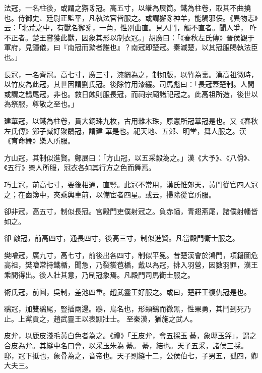 \begin{pinyinscope}
 法冠，一名柱後，或謂之獬豸冠。高五寸，以縰為展筒。鐵為柱卷，取其不曲撓也。侍御史、廷尉正監平，凡執法官皆服之。或謂獬豸神羊，能觸邪佞。《異物志》云：「北荒之中，有獸名獬豸，一角，性別曲直。見人鬥，觸不直者。聞人爭，
 咋不正者。楚王嘗獲此獸，因象其形以制衣冠。」胡廣曰：「《春秋左氏傳》晉侯觀于軍府，見鐘儀，曰『南冠而縶者誰也』？南冠即楚冠。秦滅楚，以其冠服賜執法臣也。」



 長冠，一名齊冠。高七寸，廣三寸，漆纚為之，制如版，以竹為裏。漢高祖微時，以竹皮為此冠，其世因謂劉氏冠。後除竹用漆纚。司馬彪曰：「長冠蓋楚制。人間或謂之鵲尾冠，非也。救日蝕則服長冠，而祠宗廟諸祀冠之。此高祖所造，後世以為祭服，尊敬之至也。」



 建華冠，以鐵為柱卷，貫大銅珠九枚，古用雜木珠，原憲所冠華冠是也。又《春秋左氏傳》鄭子臧好聚鷸冠，謂建
 華是也。祀天地、五郊、明堂，舞人服之。漢《育命舞》樂人所服。



 方山冠，其制似進賢。鄭展曰：「方山冠，以五采縠為之。」漢《大予》、《八佾》、《五行》樂人所服，冠衣各如其行方之色而舞焉。



 巧士冠，前高七寸，要後相通，直豎。此冠不常用，漢氏惟郊天，黃門從官四人冠之；在鹵簿中，夾乘輿車前，以備宦者四星。或云，掃除從官所服。



 卻非冠，高五寸，制似長冠。宮殿門吏僕射冠之。負赤幡，青翅燕尾，諸僕射幡皆如之。



 卻
 敵冠，前高四寸，通長四寸，後高三寸，制似進賢。凡當殿門衛士服之。



 樊噲冠，廣九寸，高七寸，前後出各四寸，制似平冕。昔楚漢會於鴻門，項籍圖危高祖，樊噲常持鐵楯，聞急，乃裂裳苞楯，戴以為冠，排入羽營，因數羽罪，漢王乘間得出。後人壯其意，乃制冠象焉。凡殿門司馬衛士服之。



 術氏冠，前圓，吳制，差池四重。趙武靈王好服之。或曰，楚莊王復仇冠是也。



 鶡冠，加雙鶡尾，豎插兩邊。鶡，鳥名也，形類鷂而微黑，性果勇，其鬥到死乃止。上黨貢之，趙武靈王以表顯壯士。
 至秦漢，猶施之武人。



 皮弁，以鹿皮淺毛黃白色者為之。《禮》「王皮弁，會五採玉綦，象邸玉笄」，謂之合皮為弁。其縫中名曰會，以采玉朱為綦。綦，結也。天子五采，諸侯三採。邸，冠下抵也，象骨為之，音帝也。天子則縫十二，公侯伯七，子男五，孤四，卿大夫三。




\end{pinyinscope}
